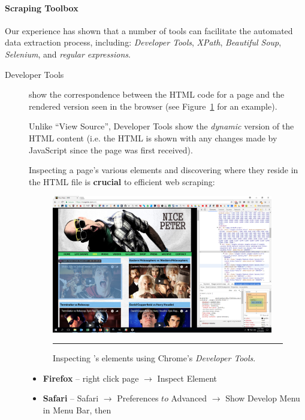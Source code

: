 \paragraph{Scraping Toolbox} Our experience has shown that a number of tools can facilitate the automated data extraction process, including: 
\textit{Developer Tools}, \textit{XPath}, \textit{Beautiful Soup}, \textit{Selenium}, and \textit{regular expressions}. 
\begin{description}
\item[Developer Tools] show the correspondence between the HTML code for a page and the rendered version seen in the browser (see Figure~\ref{fig:erb} for an example). \par Unlike ``View Source'', Developer Tools show the \textit{dynamic} version of the HTML content (i.e. the HTML is shown with any changes made by JavaScript since the page was first received).
\par Inspecting a page's various elements and discovering where they reside in the HTML file is \textbf{crucial} to efficient web scraping: 
\begin{figure}[th!]
\centering
\includegraphics[width=0.95\textwidth]{images/DC/erb.png}
\caption[\small Inspecting a webpage elements using Chrome's \textit{Developer Tools}]{\small Inspecting 's elements using Chrome's \textit{Developer Tools}.} \hrule\label{fig:erb}
\end{figure}
\afterpage{\FloatBarrier}
\begin{itemize}[noitemsep]
\item \textbf{Firefox} -- right click page $\to$ Inspect Element
\item \textbf{Safari} -- Safari $\to$ Preferences $to$ Advanced $\to$ Show Develop Menu in Menu Bar, then  

\end{itemize}
\end{description}

